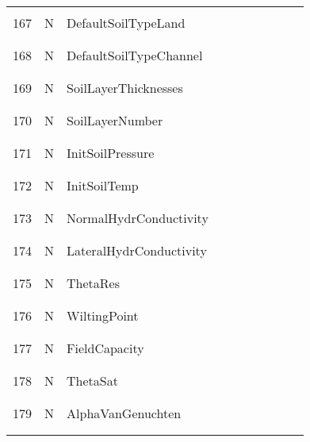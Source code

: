 \begin{longtable}{|c|c|l|c|c|c|c|p{}|c|p{}|}
&&&&&&&&&\\\hline%
&&&&&&&&&\\
167 & N & DefaultSoilTypeLand & & & & & & & \\
&&&&&&&&&\\\hline%
&&&&&&&&&\\
168 & N & DefaultSoilTypeChannel & & & & & & & \\
&&&&&&&&&\\\hline%
&&&&&&&&&\\
169 & N & SoilLayerThicknesses & & & & & & & \\
&&&&&&&&&\\\hline%
&&&&&&&&&\\
170 & N & SoilLayerNumber & & & & & & & \\
&&&&&&&&&\\\hline%
&&&&&&&&&\\
171 & N & InitSoilPressure & & & & & & & \\
&&&&&&&&&\\\hline%
&&&&&&&&&\\
172 & N & InitSoilTemp & & & & & & & \\
&&&&&&&&&\\\hline%
&&&&&&&&&\\
173 & N & NormalHydrConductivity & & & & & & & \\
&&&&&&&&&\\\hline%
&&&&&&&&&\\
174 & N & LateralHydrConductivity & & & & & & & \\
&&&&&&&&&\\\hline%
&&&&&&&&&\\
175 & N & ThetaRes & & & & & & & \\
&&&&&&&&&\\\hline%
&&&&&&&&&\\
176 & N & WiltingPoint & & & & & & & \\
&&&&&&&&&\\\hline%
&&&&&&&&&\\
177 & N & FieldCapacity & & & & & & & \\
&&&&&&&&&\\\hline%
&&&&&&&&&\\
178 & N & ThetaSat & & & & & & & \\
&&&&&&&&&\\\hline%
&&&&&&&&&\\
179 & N & AlphaVanGenuchten & & & & & & & \\
&&&&&&&&&\\\hline%
&&&&&&&&&\\

\end{longtable}
